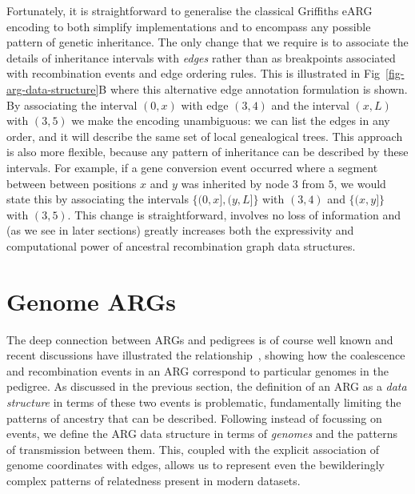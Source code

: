 \documentclass{article}
\begin{document}
Fortunately, it is straightforward to generalise the classical Griffiths
eARG encoding to both simplify implementations and to encompass any
possible pattern of genetic inheritance.
The only change that we require is to associate
the details of inheritance intervals with \emph{edges} rather than
as breakpoints associated with recombination events and
edge ordering rules. This is illustrated in Fig~\ref{fig-arg-data-structure}B
where this alternative edge annotation formulation is
shown. By associating the interval $(0, x)$ with edge $(3,4)$
and the interval $(x, L)$ with $(3, 5)$ we make the encoding
unambiguous: we can list the edges in any order, and it
will describe the same set of local genealogical trees.
This approach is also more flexible, because any pattern
of inheritance can be described by these intervals. For
example, if a gene conversion event occurred where a segment
between between positions $x$ and $y$ was inherited by
node $3$ from $5$, we would state this by associating
the intervals $\{(0, x], (y, L]\}$ with $(3,4)$ and
$\{(x, y]\}$ with $(3,5)$.
This change is straightforward, involves no loss of information
and (as we see in later sections)
greatly increases both the expressivity and computational
power of ancestral recombination graph data structures.

\section*{Genome ARGs}
The deep connection between ARGs and pedigrees is of course
well known
\citep[e.g.][]{wakeley2012genetics,gusfield2014recombinatorics,
speed2015naturereviewsgenetics}
and recent discussions have illustrated the
relationship~\citep{mathieson2020ancestry,brandt2021evaluation}, %
showing how the coalescence and recombination events in an ARG
correspond to particular genomes in the pedigree.
As discussed in the previous section, the definition of an ARG
as a \emph{data structure} in terms of these two events is problematic,
fundamentally limiting the patterns of ancestry that can be described.
Following \cite{mathieson2020ancestry} instead of focussing on events,
we define the ARG data structure in terms of \emph{genomes} and the
patterns of transmission between them.
This, coupled with
the explicit association of genome coordinates with edges, allows
us to represent even the bewilderingly complex patterns of relatedness
present in modern datasets.
\end{document}
